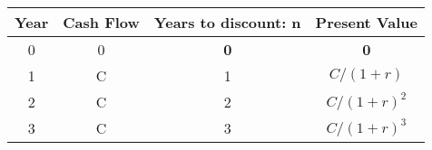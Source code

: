 \begin{tabular}{|c|c|c|c|}
\hline
Year  & Cash Flow & Years to \textbf{discount}: \textbf{n} & Present Value \\
\hline
0 & 0 & \textbf{0} & \textbf{0} \\
1 & C & 1 & $C/(1+r)$\\
2 & C & 2 & $C/(1+r)^2$ \\
3 & C & 3 & $C/(1+r)^3$ \\
\hline
\end{tabular}
